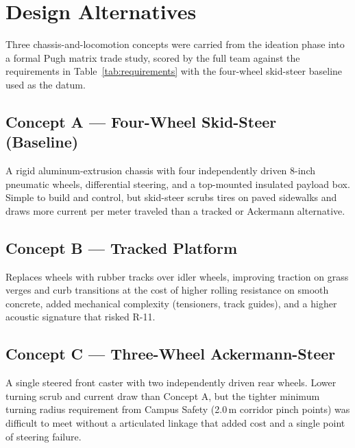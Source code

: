 \section{Design Alternatives}
\label{sec:alternatives}

Three chassis-and-locomotion concepts were carried from the ideation phase into
a formal Pugh matrix trade study, scored by the full team against the
requirements in Table~\ref{tab:requirements} with the four-wheel skid-steer
baseline used as the datum.

\subsection{Concept A --- Four-Wheel Skid-Steer (Baseline)}
A rigid aluminum-extrusion chassis with four independently driven 8-inch
pneumatic wheels, differential steering, and a top-mounted insulated payload
box. Simple to build and control, but skid-steer scrubs tires on paved
sidewalks and draws more current per meter traveled than a tracked or
Ackermann alternative.

\subsection{Concept B --- Tracked Platform}
Replaces wheels with rubber tracks over idler wheels, improving traction on
grass verges and curb transitions at the cost of higher rolling resistance on
smooth concrete, added mechanical complexity (tensioners, track guides), and
a higher acoustic signature that risked R-11.

\subsection{Concept C --- Three-Wheel Ackermann-Steer}
A single steered front caster with two independently driven rear wheels.
Lower turning scrub and current draw than Concept A, but the tighter minimum
turning radius requirement from Campus Safety (2.0\,m corridor pinch points)
was difficult to meet without a articulated linkage that added cost and a
single point of steering failure.

